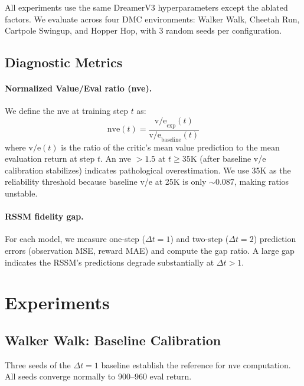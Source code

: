 \documentclass[10pt,letterpaper]{article}
\begin{document}
All experiments use the same DreamerV3 hyperparameters except the ablated factors. We evaluate across four DMC environments: Walker Walk, Cheetah Run, Cartpole Swingup, and Hopper Hop, with 3 random seeds per configuration.

\subsection{Diagnostic Metrics}

\paragraph{Normalized Value/Eval ratio (nve).}
We define the nve at training step $t$ as:
\begin{equation}
    \text{nve}(t) = \frac{\text{v/e}_{\text{exp}}(t)}{\text{v/e}_{\text{baseline}}(t)}
\end{equation}
where $\text{v/e}(t)$ is the ratio of the critic's mean value prediction to the mean evaluation return at step $t$. An nve $> 1.5$ at $t \geq 35$K (after baseline v/e calibration stabilizes) indicates pathological overestimation. We use 35K as the reliability threshold because baseline v/e at 25K is only $\sim$0.087, making ratios unstable.

\paragraph{RSSM fidelity gap.}
For each model, we measure one-step ($\Delta t{=}1$) and two-step ($\Delta t{=}2$) prediction errors (observation MSE, reward MAE) and compute the gap ratio. A large gap indicates the RSSM's predictions degrade substantially at $\Delta t{>}1$.

\section{Experiments}
\label{sec:experiments}

\subsection{Walker Walk: Baseline Calibration}
\label{sec:walker-baseline}

Three seeds of the $\Delta t{=}1$ baseline establish the reference for nve computation. All seeds converge normally to 900--960 eval return.
\end{document}
